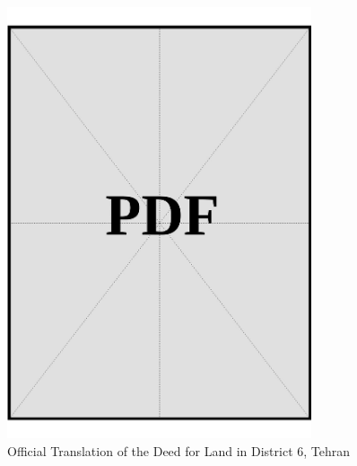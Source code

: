 \vspace*{\fill}
\begin{figure}[h]
    \centering
    \includegraphics[page=1, width=0.8\textwidth]{../docs/applicant/funds/property-deeds/property-1/official-translations.pdf}
    \caption{Official Translation of the Deed for Land in District 6, Tehran}
    \label{fig:applicant-land-dist6-tehran-official-translation}
\end{figure}
\vspace*{\fill}

\clearpage


